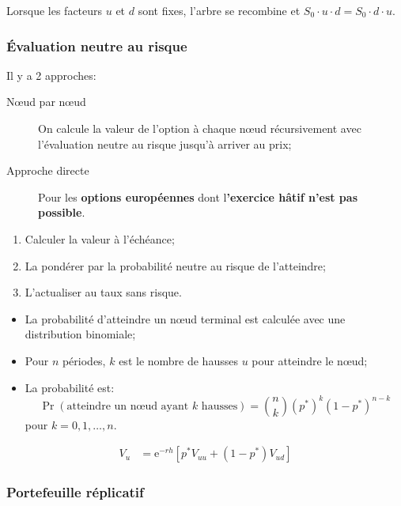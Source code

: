 \documentclass[10pt, french]{article}
\begin{document}
\begin{multicols*}{2}
Lorsque les facteurs $u$ et $d$ sont fixes, l'arbre se recombine et $S_{0} \cdot u \cdot d = S_{0} \cdot d \cdot u$.

\subsubsection*{Évaluation neutre au risque}

Il y a 2 approches:
\begin{description}
	\item[Nœud par nœud]	On calcule la valeur de l'option à chaque nœud récursivement avec l'évaluation neutre au risque jusqu'à arriver au prix;
	\item[Approche directe]	Pour les \textbf{options européennes} dont l\textbf{'exercice hâtif n'est pas possible}.
\end{description}

\begin{algo2}
\begin{enumerate}[leftmargin = *]
	\item	Calculer la valeur à l'échéance;
	\item	La pondérer par la probabilité neutre au risque de l'atteindre;
	\item	L'actualiser au taux sans risque.
\end{enumerate}
\tcbline
\begin{itemize}[leftmargin = *]
	\item	La probabilité d'atteindre un nœud terminal est calculée avec une distribution binomiale;
	\item	Pour $n$ périodes, $k$ est le nombre de hausses $u$ pour atteindre le nœud;
	\item	La probabilité est: \[\Pr(\text{atteindre un nœud ayant $k$ hausses})	=	\binom{n}{k} (p^{*})^{k} (1 - p^{*})^{n - k}\] pour $k = 0, 1, \dots, n$.
\end{itemize}
\end{algo2}

\begin{distributions}
\begin{align*}
	V_{u}	&=	\textrm{e}^{-r h}\left[ p^{*}V_{uu} + (1 - p^{*})V_{ud} \right]
\end{align*}
\end{distributions}

\subsubsection*{Portefeuille réplicatif}


\end{multicols*}
\end{document}
